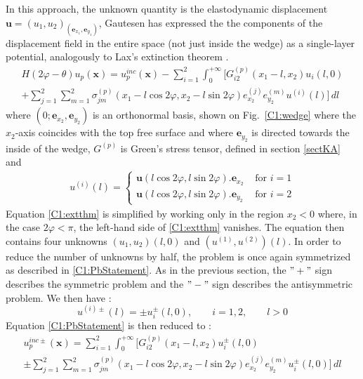 In this approach, the unknown quantity is the elastodynamic displacement $\mathbf{u}=(u_1,u_2)_{(\mathbf{e}_{x_1},\mathbf{e}_{y_1})}$, Gautesen \cite{GautesenRayleigh} has expressed the the components of the displacement field in the entire space (not just inside the wedge) as a single-layer potential, analogously to Lax's extinction theorem \cite{Lax}.
\begin{multline}
H(2\varphi-\theta)u_p(\mathbf{x})=u_p^{inc}(\mathbf{x})-\sum_{i=1}^2\int_0^{+\infty}\Big[ G_{i2}^{(p)}(x_1-l,x_2)u_i(l,0) \\
 +\sum_{j=1}^2\sum_{m=1}^2\sigma_{jm}^{(p)}(x_1-l\cos 2\varphi,x_2-l\sin 2\varphi)e_{x_2}^{(j)}e_{y_2}^{(m)}u^{(i)}(l) \Big] \, dl
 \label{C1:extthm}
\end{multline}
where $(0;\mathbf{e}_{x_2},\mathbf{e}_{y_2})$ is an orthonormal basis, shown on Fig.~\ref{C1:wedge} where the $x_2$-axis coincides with the top free surface and where $\mathbf{e}_{y_2}$ is directed towards the inside of the wedge, $G^{(p)}$ is Green's stress tensor, defined in section \ref{sectKA} and
\begin{eqnarray}
u^{(i)}(l)=
\left\{
\begin{array}{cc}
\mathbf{u}(l\cos 2\varphi,l\sin 2\varphi).\mathbf{e}_{x_2} & \mbox{ for } i=1 \\
\mathbf{u}(l\cos 2\varphi,l\sin 2\varphi).\mathbf{e}_{y_2} & \mbox{ for } i=2
\end{array}
\right.
\end{eqnarray}
Equation \eqref{C1:extthm} is simplified by working only in the region $x_2<0$ where, in the case $2\varphi<\pi$, the left-hand side of \eqref{C1:extthm} vanishes. The equation then contains four unknowns $(u_1,u_2)(l,0)$ and $(u^{(1)},u^{(2)})(l)$. In order to reduce the number of unknowns by half, the problem is once again symmetrized as described in \ref{C1:PbStatement}. As in the previous section, the $"+"$ sign describes the symmetric problem and the $"-"$ sign describes the antisymmetric problem. We then have :
\begin{equation}
u^{(i)\pm}(l)=\pm u_i^\pm(l,0), \hspace{2em} i=1,2, \hspace{2em} l>0
\end{equation}
Equation \eqref{C1:PbStatement} is then reduced to :
\begin{multline}
u_p^{inc \pm}(\mathbf{x})=\sum_{i=1}^2\int_0^{+\infty}\Big[ G_{i2}^{(p)}(x_1-l,x_2)u_i^\pm(l,0)\\
\pm\sum_{j=1}^2\sum_{m=1}^2\sigma_{jm}^{(p)}(x_1-l\cos 2\varphi,x_2-l\sin 2\varphi)e_{x_2}^{(j)}e_{y_2}^{(m)}u_i^\pm(l,0) \Big] \, dl
\label{C1:extthmsym}
\end{multline}
